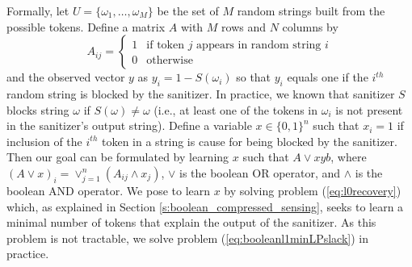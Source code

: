Formally, let $U=\{\omega_1,\ldots,\omega_M\}$ be the set of $M$ random strings built from the possible tokens.  Define a matrix $A$ with $M$ rows and $N$ columns by 
\[A_{ij}=
\begin{cases} 1 &\mbox{if token } j \mbox{ appears in random string } i \\
0 & \mbox{otherwise}
\end{cases} 
\]
and the observed vector $y$ as $y_i=1-S(\omega_i)$ so that $y_i$ equals one if the $i^{th}$ random string is blocked by the sanitizer.  In practice, we known that sanitizer $S$ blocks string $\omega$ if $S(\omega)\neq\omega$ (i.e., at least one of the tokens in $\omega_i$ is not present in the sanitizer's output string).  Define a variable $x\in\{0,1\}^n$ such that $x_i=1$ if inclusion of the $i^{th}$ token in a string is cause for being blocked by the sanitizer.  Then our goal can be formulated by learning $x$ such that $A\vee xyb$, where $(A\vee x)_i=\vee_{j=1}^n(A_{ij}\wedge x_j)$, $\vee$ is the boolean OR operator, and $\wedge$ is the boolean AND operator.  We pose to learn $x$ by solving problem (\ref{eq:l0recovery}) which, as explained in Section \ref{s:boolean_compressed_sensing}, seeks to learn a minimal number of tokens that explain the output of the sanitizer. As this problem is not tractable, we solve problem (\ref{eq:booleanl1minLPslack}) in practice. 

